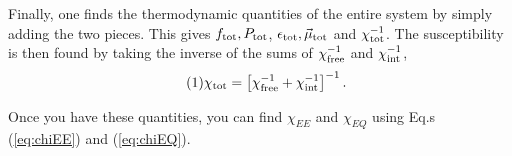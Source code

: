 \documentclass[12pt]{article}
\numberwithin{equation}{section}
\numberwithin{figure}{section}
\newcommand\eqnumber{\addtocounter{equation}{1}\tag{\theequation}}
\begin{document}
Finally, one finds the thermodynamic quantities of the entire system by simply adding the two pieces. This gives $f_{\rm tot}, P_{\rm tot}$, $\epsilon_{\rm tot}, \vec{\mu}_{\rm tot}$ and $\chi^{-1}_{\rm tot}$. The susceptibility is then found by taking the inverse of the sums of $\chi^{-1}_{\rm free}$ and $\chi^{-1}_{\rm int}$,
\begin{align*}\eqnumber
\chi_{\rm tot}&=\left[\chi^{-1}_{\rm free}+\chi^{-1}_{\rm int}\right]^{-1}.
\end{align*}

Once you have these quantities, you can find $\chi_{EE}$ and $\chi_{EQ}$ using Eq.s (\ref{eq:chiEE}) and (\ref{eq:chiEQ}).
\end{document}
